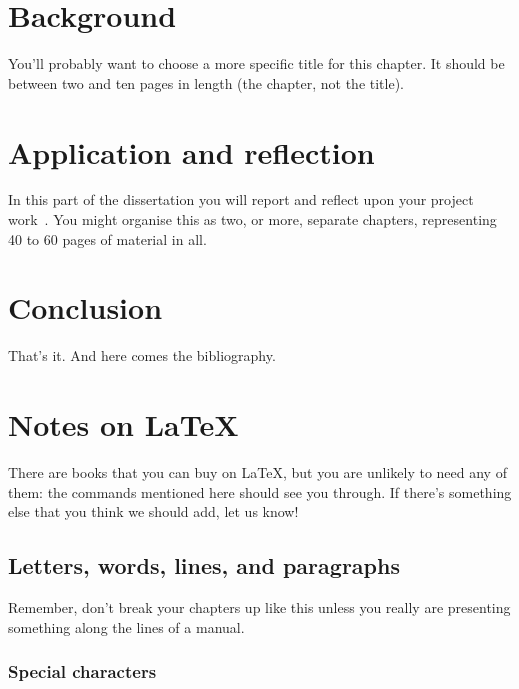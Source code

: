 \documentclass[dissertation]{softeng}
\begin{document}
\chapter{Background}

You'll probably want to choose a more specific title for this
chapter.  It should be between two and ten pages in length (the
chapter, not the title).  

\chapter{Application and reflection}

In this part of the dissertation you will report and reflect upon your
project work~\cite{exampleref}.  You might organise this as two, or more,
separate chapters, representing 40 to 60 pages of material in all.

\chapter{Conclusion}

That's it.  And here comes the bibliography. 




\appendix

\chapter{Notes on \LaTeX}
\label{chap:latex}

There are books that you can buy on \LaTeX, but you are unlikely to
need any of them: the commands mentioned here should see you through.
If there's something else that you think we should add, let us know!

\section{Letters, words, lines, and paragraphs}

Remember, don't break your chapters up like this unless you really are
presenting something along the lines of a manual.   

\subsection{Special characters}
\end{document}
